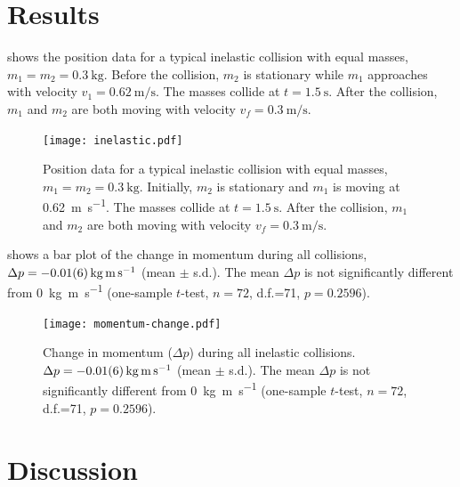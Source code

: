 \documentclass[aps,prl,preprint]{revtex4-1}
\begin{document}
\section{Results}
 shows the position data for a typical inelastic collision with equal masses, $m_1=m_2=\SI{0.3}{\kilo\gram}$. Before the collision, $m_2$ is stationary while $m_1$ approaches with velocity $v_1=\SI{0.62}{\meter\per\second}$. The masses collide at $t=\SI{1.5}{\second}$. After the collision, $m_1$ and $m_2$ are both moving with velocity $v_f=\SI{0.3}{\meter\per\second}$. 
\begin{figure}
\begin{center}
\texttt{[image: inelastic.pdf]}
\end{center}
\caption{Position data for a typical inelastic collision with equal masses, $m_1=m_2=\SI{0.3}{\kilo\gram}$. Initially, $m_2$ is stationary and $m_1$ is moving at \SI{0.62}{\meter\per\second}. The masses collide at $t=\SI{1.5}{\second}$. After the collision, $m_1$ and $m_2$ are both moving with velocity $v_f=\SI{0.3}{\meter\per\second}$. }
\label{fig:results1}
\end{figure}
 shows a bar plot of the change in momentum during all collisions, $\Delta p = \SI{-0.01\pm0.06}{\kilo\gram\meter\per\second}$ (mean $\pm$ s.d.). The mean $\Delta p$ is not significantly different from \SI{0}{\kilo\gram\meter\per\second} (one-sample $t$-test, $n=72$, d.f.=71, $p=0.2596$). 
\begin{figure}
\begin{center}
\texttt{[image: momentum-change.pdf]}
\end{center}
\caption{Change in momentum ($\Delta p$) during all inelastic collisions. $\Delta p = \SI{-0.01\pm0.06}{\kilo\gram\meter\per\second}$ (mean $\pm$ s.d.). The mean $\Delta p$ is not significantly different from \SI{0}{\kilo\gram\meter\per\second} (one-sample $t$-test, $n=72$, d.f.=71, $p=0.2596$).}
\label{fig:results2}
\end{figure}

\section{Discussion}
\end{document}
